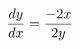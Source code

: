 \documentclass[preview]{standalone}
\begin{document}
\begin{align*}
{dy \over dx} = {-2x \over 2y}
\end{align*}
\end{document}
